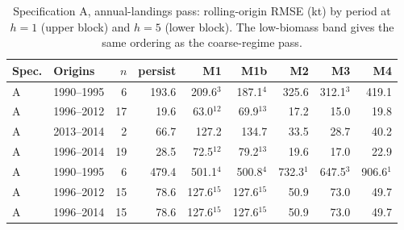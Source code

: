 \documentclass[preprint,11pt,authoryear]{elsarticle}
\theoremstyle{remark}
\begin{document}
\begin{table}[!htb]
\centering\small
\caption{Specification A, annual-landings pass: rolling-origin RMSE (kt) by period at $h=1$ (upper block) and $h=5$ (lower block). The low-biomass band gives the same ordering as the coarse-regime pass.}
\label{tab:si_annual}
\begin{tabular}{@{}llrrrrrrr@{}}
\toprule
Spec. & Origins & $n$ & persist & M1 & M1b & M2 & M3 & M4 \\
\midrule
A & 1990--1995 & 6 & 193.6 & 209.6$^{3}$ & 187.1$^{4}$ & 325.6 & 312.1$^{3}$ & 419.1 \\
A & 1996--2012 & 17 & 19.6 & 63.0$^{12}$ & 69.9$^{13}$ & 17.2 & 15.0 & 19.8 \\
A & 2013--2014 & 2 & 66.7 & 127.2 & 134.7 & 33.5 & 28.7 & 40.2 \\
A & 1996--2014 & 19 & 28.5 & 72.5$^{12}$ & 79.2$^{13}$ & 19.6 & 17.0 & 22.9 \\
\midrule
A & 1990--1995 & 6 & 479.4 & 501.1$^{4}$ & 500.8$^{4}$ & 732.3$^{1}$ & 647.5$^{3}$ & 906.6$^{1}$ \\
A & 1996--2012 & 15 & 78.6 & 127.6$^{15}$ & 127.6$^{15}$ & 50.9 & 73.0 & 49.7 \\
A & 1996--2014 & 15 & 78.6 & 127.6$^{15}$ & 127.6$^{15}$ & 50.9 & 73.0 & 49.7 \\
\bottomrule
\end{tabular}
\end{table}
\end{document}
